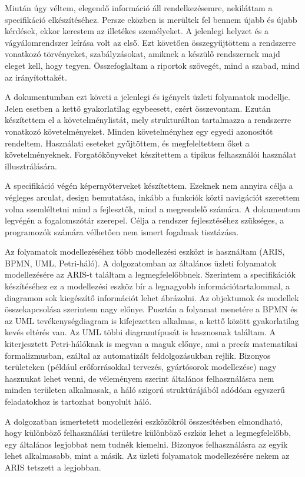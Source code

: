 \documentclass[12pt]{article}
\begin{document}
Miután úgy véltem, elegendő információ áll rendelkezésemre, nekiláttam a specifikáció elkészítéséhez. Persze eközben is merültek fel bennem újabb és újabb kérdések, ekkor kerestem az illetékes személyeket. A jelenlegi helyzet és a vágyálomrendszer leírása volt az első. Ezt követően összegyűjtöttem a rendszerre vonatkozó törvényeket, szabályzásokat, amiknek a készülő rendszernek majd eleget kell, hogy tegyen. Összefoglaltam a riportok szövegét, mind a szabad, mind az irányítottakét.

A dokumentumban ezt követi a jelenlegi és igényelt üzleti folyamatok modellje. Jelen esetben a kettő gyakorlatilag egybeesett, ezért összevontam. Ezután készítettem el a követelménylistát, mely strukturáltan tartalmazza a rendszerre vonatkozó követelményeket. Minden követelményhez egy egyedi azonosítót rendeltem. Használati eseteket gyűjtöttem, és megfeleltettem őket a követelményeknek. Forgatókönyveket készítettem a tipikus felhasználói használat illusztrálására.

A specifikáció végén képernyőterveket készítettem. Ezeknek nem annyira célja a végleges arculat, design bemutatása, inkább a funkciók közti navigációt szerettem volna szemléltetni mind a fejlesztők, mind a megrendelő számára. A dokumentum legvégén a fogalomszótár szerepel. Célja a rendszer fejlesztéséhez szükséges, a programozók számára vélhetően nem ismert fogalmak tisztázása.

Az folyamatok modellezéséhez több modellezési eszközt is használtam (ARIS, BPMN, UML, Petri-háló).  A dolgozatomban az általános üzleti folyamatok modellezésére az ARIS-t találtam a legmegfelelőbbnek. Szerintem a specifikációk készítéséhez ez a modellezési eszköz bír a legnagyobb információtartalommal, a diagramon sok kiegészítő információt lehet ábrázolni. Az objektumok és modellek összekapcsolása szerintem nagy előnye. Pusztán a folyamat menetére a BPMN és az UML tevékenységdiagram is kifejezetten alkalmas, a kettő között gyakorlatilag kevés eltérés van. Az UML többi diagramtípusát is hasznosnak találtam. A kiterjesztett Petri-hálóknak is megvan a maguk előnye, ami a precíz matematikai formalizmusban, ezáltal az automatizált feldolgozásukban rejlik. Bizonyos területeken (például erőforrásokkal tervezés, gyártósorok modellezése) nagy hasznukat lehet venni, de véleményem szerint általános felhasználásra nem minden területen alkalmasak, a háló szigorú struktúrájából adódóan egyszerű feladatokhoz is tartozhat bonyolult háló.

A dolgozatban ismertetett modellezési eszközökről összesítésben elmondható, hogy különböző felhasználási területre különböző eszköz lehet a legmegfelelőbb, egy általános legjobbat nem tudnék kiemelni. Bizonyos felhasználásra az egyik lehet alkalmasabb, mint a másik. Az üzleti folyamatok modellezésére nekem az ARIS tetszett a legjobban.
\end{document}
